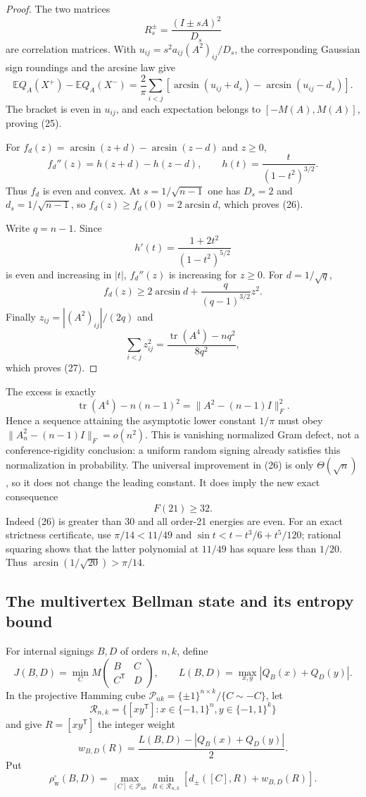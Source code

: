 \documentclass[11pt]{article}
\newcommand{\eps}{\{-1,1\}}
\begin{document}
\begin{proof}
The two matrices
\[
 R_s^\pm=\frac{(I\pm sA)^2}{D_s}
\]
are correlation matrices.  With
$u_{ij}=s^2a_{ij}(A^2)_{ij}/D_s$, the corresponding Gaussian sign
roundings and the arcsine law give
\[
 \mathbb E Q_A(X^+)-\mathbb E Q_A(X^-)
 =\frac2\pi\sum_{i<j}
 [\arcsin(u_{ij}+d_s)-\arcsin(u_{ij}-d_s)].
\]
The bracket is even in $u_{ij}$, and each expectation belongs to
$[-M(A),M(A)]$, proving (25).

For $f_d(z)=\arcsin(z+d)-\arcsin(z-d)$ and $z\ge0$,
\[
 f_d''(z)=h(z+d)-h(z-d),\qquad
 h(t)=\frac{t}{(1-t^2)^{3/2}}.
\]
Thus $f_d$ is even and convex.  At $s=1/\sqrt{n-1}$ one has
$D_s=2$ and $d_s=1/\sqrt{n-1}$, so
$f_d(z)\ge f_d(0)=2\arcsin d$, which proves (26).

Write $q=n-1$.  Since
\[
 h'(t)=\frac{1+2t^2}{(1-t^2)^{5/2}}
\]
is even and increasing in $|t|$, $f_d''(z)$ is increasing for $z\ge0$.
For $d=1/\sqrt q$,
\[
 f_d(z)\ge2\arcsin d+\frac{q}{(q-1)^{3/2}}z^2.
\]
Finally $z_{ij}=|(A^2)_{ij}|/(2q)$ and
\[
 \sum_{i<j}z_{ij}^2
 =\frac{\operatorname{tr}(A^4)-nq^2}{8q^2},
\]
which proves (27).
\end{proof}

The excess is exactly
\[
 \operatorname{tr}(A^4)-n(n-1)^2
 =\|A^2-(n-1)I\|_F^2.
\]
Hence a sequence attaining the asymptotic lower constant $1/\pi$ must obey
$\|A_n^2-(n-1)I\|_F=o(n^2)$.  This is vanishing normalized Gram defect, not a
conference-rigidity conclusion: a uniform random signing already satisfies
this normalization in probability.  The universal improvement in (26) is only
$\Theta(\sqrt n)$, so it does not change the leading constant.  It does imply
the new exact consequence
\[
 \boxed{F(21)\ge32}.
\]
Indeed (26) is greater than 30 and all order-21 energies are even.  For an
exact strictness certificate, use $\pi/14<11/49$ and
$\sin t<t-t^3/6+t^5/120$; rational squaring shows that the latter polynomial
at $11/49$ has square less than $1/20$.  Thus
$\arcsin(1/\sqrt{20})>\pi/14$.

\subsection{The multivertex Bellman state and its entropy bound}

For internal signings $B,D$ of orders $n,k$, define
\[
 J(B,D)=\min_C M\begin{pmatrix}B&C\\C^{\mathsf T}&D\end{pmatrix},
 \qquad L(B,D)=\max_{x,y}|Q_B(x)+Q_D(y)|.
\]
In the projective Hamming cube
$\mathcal P_{nk}=\{\pm1\}^{n\times k}/\{C\sim-C\}$, let
\[
 \mathcal R_{n,k}=\{[xy^{\mathsf T}]:x\in\eps^n,y\in\eps^k\}
\]
and give $R=[xy^{\mathsf T}]$ the integer weight
\[
 w_{B,D}(R)=\frac{L(B,D)-|Q_B(x)+Q_D(y)|}{2}.
\]
Put
\[
 \rho_{\mathrm w}^{\square}(B,D)
 =\max_{[C]\in\mathcal P_{nk}}\min_{R\in\mathcal R_{n,k}}
 [d_\pm([C],R)+w_{B,D}(R)].
\]
\end{document}
